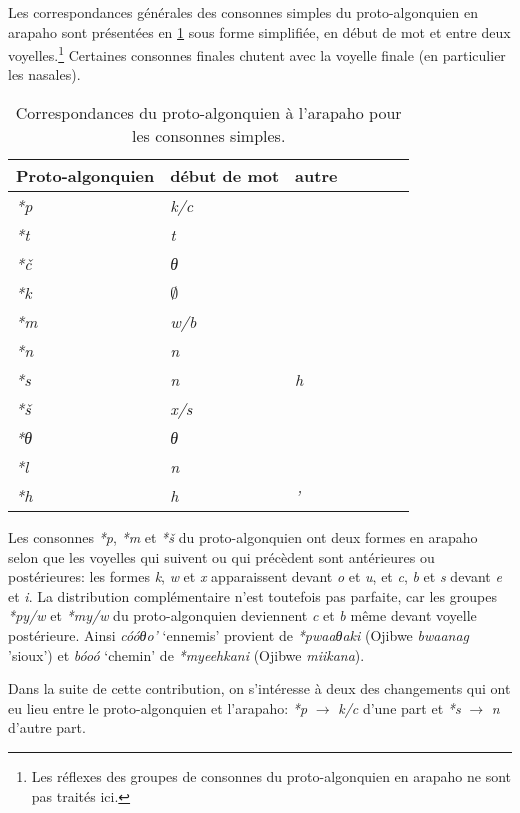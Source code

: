 \documentclass[twoside,a4paper,11pt]{article}
\newcommand{\ipa}[1]{{\phon\textit{#1}}}
\newcommand{\Σ}{\greek{Σ}}
\begin{document}
Les correspondances générales des consonnes simples du proto-algonquien en arapaho sont présentées en \ref{tab:c.simple.arapaho} sous forme simplifiée, en début de mot et entre deux voyelles.\footnote{Les réflexes des groupes de consonnes du proto-algonquien en arapaho ne sont pas traités ici.} Certaines consonnes finales chutent avec la voyelle finale (en particulier les nasales).
 \begin{table}[h]
\caption{Correspondances du proto-algonquien à l'arapaho pour les consonnes simples.} \centering  \label{tab:c.simple.arapaho}
\begin{tabular}{lllllll}
\toprule
Proto-algonquien & début de mot  & autre \\
\midrule
\ipa{*p} & 	\ipa{k/c} & 	&   	\\
\ipa{*t} & 	\ipa{t} & 	 & 	  	\\
\ipa{*č} & 	\ipa{θ} & 	   	\\
\ipa{*k} & 	$\emptyset$ & 	   	\\
\ipa{*m} & 	\ipa{w/b} & 	 & 	  	\\
\ipa{*n} & 	\ipa{n} & 	 & 	  	\\
\ipa{*s} & 	\ipa{n} & 	\ipa{h} & 	  	\\
\ipa{*š} & 	\ipa{x/s} & 	 & 	  & 	\\
\ipa{*θ} & 	\ipa{θ} &  & 	  	\\
\ipa{*l} & 	\ipa{n} &  & 	  	\\
\ipa{*h} & 	\ipa{h} & 	\ipa{'} & 	  	\\
\bottomrule
\end{tabular}
\end{table}

Les consonnes \ipa{*p}, \ipa{*m} et \ipa{*š} du proto-algonquien ont deux formes en arapaho selon que les voyelles qui suivent ou qui précèdent sont antérieures ou postérieures: les formes \ipa{k}, \ipa{w} et \ipa{x} apparaissent devant \ipa{o} et \ipa{u}, et \ipa{c}, \ipa{b} et \ipa{s} devant \ipa{e} et \ipa{i}. La distribution complémentaire n'est toutefois pas parfaite, car les groupes \ipa{*py/w} et \ipa{*my/w} du proto-algonquien deviennent \ipa{c} et \ipa{b} même devant voyelle postérieure. Ainsi \ipa{cóóθo'} `ennemis' provient de \ipa{*pwaaθaki} (Ojibwe \ipa{bwaanag} 'sioux') et \ipa{bóoó} `chemin' de \ipa{*myeehkani} (Ojibwe \ipa{miikana}).

Dans la suite de cette contribution, on s'intéresse à deux des changements qui ont eu lieu entre le proto-algonquien et l'arapaho: \ipa{*p} $\rightarrow$ \ipa{k/c} d'une part et \ipa{*s} $\rightarrow$ \ipa{n} d'autre part.
\end{document}
